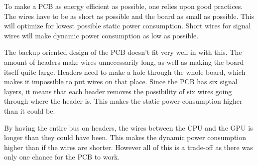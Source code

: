 \documentclass[../main/report.tex]{subfiles}
\begin{document}
To make a PCB as energy efficient as possible, one relies upon good practices.
The wires have to be as short as possible and the board as small as possible.
This will optimize for lowest possible static power consumption.
Short wires for signal wires will make dynamic power consumption as low as possible.

The backup oriented design of the PCB doesn't fit very well in with this.
The amount of headers make wires unnecessarily long, as well as making the board itself quite large.
Headers need to make a hole through the whole board, which makes it impossible to put wires on that place.
Since the PCB has six signal layers, it means that each header removes the possibility of six wires going through where the header is.
This makes the static power consumption higher than it could be.

By having the entire bus on headers, the wires between the CPU and the GPU is longer than they could have been.
This makes the dynamic power consumption higher than if the wires are shorter.
However all of this is a trade-off as there was only one chance for the PCB to work.
\end{document}
